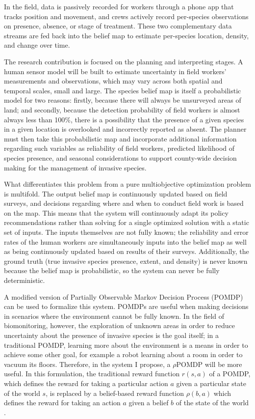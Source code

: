 \documentclass{article}
\begin{document}
In the field, data is passively recorded for workers through a phone app that tracks position and movement, and crews actively record per-species observations on presence, absence, or stage of treatment. These two complementary data streams are fed back into the belief map to estimate per-species location, density, and change over time. 

The research contribution is focused on the planning and interpreting stages. A human sensor model will be built to estimate uncertainty in field workers’ measurements and observations, which may vary across both spatial and temporal scales, small and large. The species belief map is itself a probabilistic model for two reasons: firstly, because there will always be unsurveyed areas of land; and secondly, because the detection probability of field workers is almost always less than 100\%, there is a possibility that the presence of a given species in a given location is overlooked and incorrectly reported as absent. The planner must then take this probabilistic map and incorporate additional information regarding such variables as reliability of field workers, predicted likelihood of species presence, and seasonal considerations to support county-wide decision making for the management of invasive species.

What differentiates this problem from a pure multiobjective optimization problem is multifold. The output belief map is continuously updated based on field surveys, and decisions regarding where and when to conduct field work is based on the map. This means that the system will continuously adapt its policy recommendations rather than solving for a single optimized solution with a static set of inputs. The inputs themselves are not fully known; the reliability and error rates of the human workers are simultaneously inputs into the belief map as well as being continuously updated based on results of their surveys. Additionally, the ground truth (true invasive species presence, extent, and density) is never known because the belief map is probabilistic, so the system can never be fully deterministic.

A modified version of Partially Observable Markov Decision Process (POMDP) can be used to formalize this system. POMDPs are useful when making decisions in scenarios where the environment cannot be fully known. In the field of biomonitoring, however, the exploration of unknown areas in order to reduce uncertainty about the presence of invasive species is the goal itself; in a traditional POMDP, learning more about the environment is a means in order to achieve some other goal, for example a robot learning about a room in order to vacuum its floors. Therefore, in the system I propose, a $\rho$POMDP will be more useful. In this formulation, the traditional reward function $r(s, a)$ of a POMDP, which defines the reward for taking a particular action $a$ given a particular state of the world $s$, is replaced by a belief-based reward function $\rho(b, a)$ which defines the reward for taking an action $a$ given a belief $b$ of the state of the world \cite{POMDP-extension}.
\end{document}

